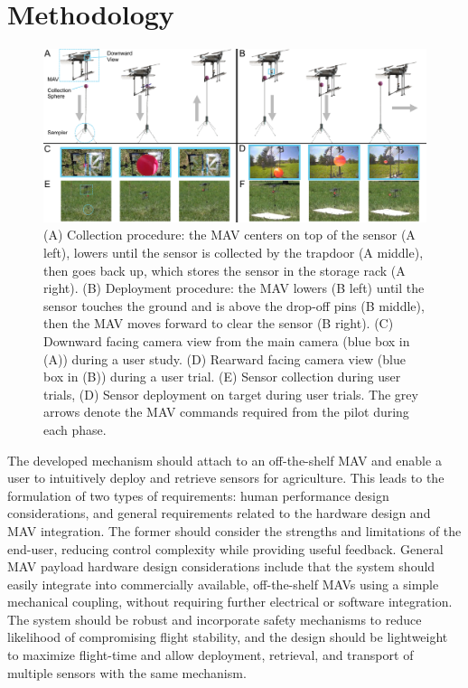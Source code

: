 \section{Methodology}

\begin{figure}[!htp]
\centering
\includegraphics[scale=1]{chapters/papers/UR/figures/fig-3a-working-principle/fig-3a-working-principle.pdf}
\caption{(A) Collection procedure: the \ac{MAV} centers on top of the sensor (A left), lowers until the sensor is collected by the trapdoor (A middle), then goes back up, which stores the sensor in the storage rack (A right). (B) Deployment procedure: the \ac{MAV} lowers (B left) until the sensor touches the ground and is above the drop-off pins (B middle), then the \ac{MAV} moves forward to clear the sensor (B right).  (C) Downward facing camera view from the main camera (blue box in (A)) during a user study. (D) Rearward facing camera view (blue box in (B)) during a user trial. (E) Sensor collection during user trials, (D) Sensor deployment on target during user trials. The grey arrows denote the \ac{MAV} commands required from the pilot during each phase.}
\label{fig:fig3a-working-principle}
\figurevspacebelow
\end{figure}

The developed mechanism should attach to an off-the-shelf \ac{MAV} and enable a user to intuitively deploy and retrieve sensors for agriculture. This leads to the formulation of two types of requirements: human performance design considerations, and general requirements related to the hardware design and \ac{MAV} integration. The former should consider the strengths and limitations of the end-user, reducing control complexity while providing useful feedback.
General \ac{MAV} payload hardware design considerations include that the system should easily integrate into commercially available, off-the-shelf \acp{MAV} using a simple mechanical coupling, without requiring further electrical or software integration. The system should be robust and incorporate safety mechanisms to reduce likelihood of compromising flight stability, and the design should be lightweight to maximize flight-time and allow deployment, retrieval, and transport of multiple sensors with the same mechanism.

